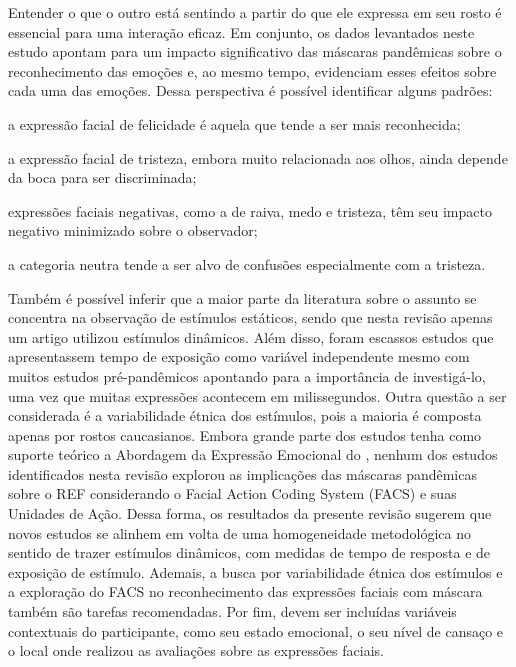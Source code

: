 \documentclass[portuguese]{textolivre}
\begin{document}
Entender o que o outro está sentindo a partir do que ele expressa em seu rosto é essencial para uma interação eficaz. Em conjunto, os dados levantados neste estudo apontam para um impacto significativo das máscaras pandêmicas sobre o reconhecimento das emoções e, ao mesmo tempo, evidenciam esses efeitos sobre cada uma das emoções. Dessa perspectiva é possível identificar alguns padrões: 
\begin{enumerate*}[label=\emph{\alph*})] 
\item a expressão facial de felicidade é aquela que tende a ser mais reconhecida; 
\item a expressão facial de tristeza, embora muito relacionada aos olhos, ainda depende da boca para ser discriminada; 
\item expressões faciais negativas, como a de raiva, medo e tristeza, têm seu impacto negativo minimizado sobre o observador; 
\item a categoria neutra tende a ser alvo de confusões especialmente com a tristeza. 
\end{enumerate*}
Também é possível inferir que a maior parte da literatura sobre o assunto se concentra na observação de estímulos estáticos, sendo que nesta revisão apenas um artigo utilizou estímulos dinâmicos. Além disso, foram escassos estudos que apresentassem tempo de exposição como variável independente mesmo com muitos estudos pré-pandêmicos apontando para a importância de investigá-lo, uma vez que muitas expressões acontecem em milissegundos. Outra questão a ser considerada é a variabilidade étnica dos estímulos, pois a maioria é composta apenas por rostos caucasianos. Embora grande parte dos estudos tenha como suporte teórico a Abordagem da Expressão Emocional do \textcite{ekman_facial_2002}, nenhum dos estudos identificados nesta revisão explorou as implicações das máscaras pandêmicas sobre o REF considerando o Facial Action Coding System (FACS) e suas Unidades de Ação. Dessa forma, os resultados da presente revisão sugerem que novos estudos se alinhem em volta de uma homogeneidade metodológica no sentido de trazer estímulos dinâmicos, com medidas de tempo de resposta e de exposição de estímulo. Ademais, a  busca por variabilidade étnica dos estímulos e a exploração do FACS no reconhecimento das expressões faciais com máscara também são tarefas recomendadas. Por fim, devem ser incluídas variáveis contextuais do participante, como seu estado emocional, o seu nível de cansaço e o local onde realizou as avaliações sobre as expressões faciais.
\end{document}
